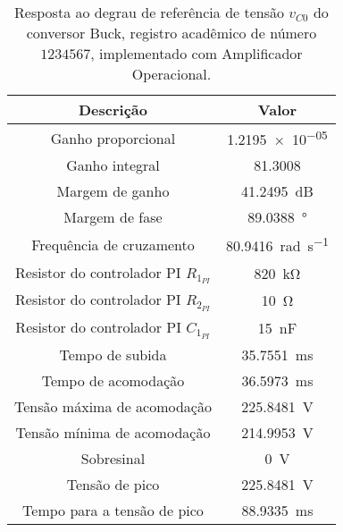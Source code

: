 \begin{table}[!ht]
\centering
\caption{Resposta ao degrau de referência de tensão $v_{C0}$ do conversor Buck, registro acadêmico de número $1234567$, implementado com Amplificador Operacional.}
\label{tab:resposta1malhaAmpOp}
\begin{tabular}{@{}cc@{}}
\toprule
\textbf{Descrição} & \textbf{Valor}\\ \midrule
Ganho proporcional & \SI{1.2195e-05}{}\\
Ganho integral & \SI{81.3008}{}\\
Margem de ganho & \SI{41.2495}{\deci\bel}\\
Margem de fase & \SI{89.0388}{\degree}\\
Frequência de cruzamento & \SI{80.9416}{\radian\per\s}\\
Resistor do controlador PI $R_{1_{PI}}$ & \SI{820}{\kilo\ohm}\\
Resistor do controlador PI $R_{2_{PI}}$ & \SI{10}{\ohm}\\
Resistor do controlador PI $C_{1_{PI}}$ & \SI{15}{\nano\F}\\
Tempo de subida & \SI{35.7551}{\milli\s}\\
Tempo de acomodação & \SI{36.5973}{\milli\s}\\
Tensão máxima de acomodação & \SI{225.8481}{\V}\\
Tensão mínima de acomodação & \SI{214.9953}{\V}\\
Sobresinal & \SI{0}{\V}\\
Tensão de pico & \SI{225.8481}{\V}\\
Tempo para a tensão de pico & \SI{88.9335}{\milli\s}\\
\bottomrule
\end{tabular}
\end{table}

